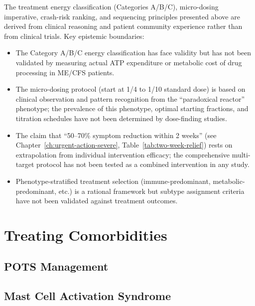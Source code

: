 \begin{limitation}
The treatment energy classification (Categories A/B/C), micro-dosing imperative, crash-risk ranking, and sequencing principles presented above are derived from clinical reasoning and patient community experience rather than from clinical trials. Key epistemic boundaries:
\begin{itemize}
    \item The Category A/B/C energy classification has face validity but has not been validated by measuring actual ATP expenditure or metabolic cost of drug processing in ME/CFS patients.
    \item The micro-dosing protocol (start at 1/4 to 1/10 standard dose) is based on clinical observation and pattern recognition from the ``paradoxical reactor'' phenotype; the prevalence of this phenotype, optimal starting fractions, and titration schedules have not been determined by dose-finding studies.
    \item The claim that ``50--70\% symptom reduction within 2 weeks'' (see Chapter~\ref{ch:urgent-action-severe}, Table~\ref{tab:two-week-relief}) rests on extrapolation from individual intervention efficacy; the comprehensive multi-target protocol has not been tested as a combined intervention in any study.
    \item Phenotype-stratified treatment selection (immune-predominant, metabolic-predominant, etc.) is a rational framework but subtype assignment criteria have not been validated against treatment outcomes.
\end{itemize}
\end{limitation}

\section{Treating Comorbidities}
\label{sec:comorbidities-treatment}

\subsection{POTS Management}

\subsection{Mast Cell Activation Syndrome}
\label{subsec:mcas-treatment}


